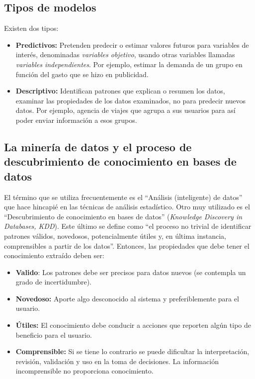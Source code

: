 \documentclass{article}
\begin{document}
\subsection{Tipos de modelos}

Existen dos tipos:

\begin{itemize}
  \item \textbf{Predictivos:} Pretenden predecir o estimar valores futuros para variables de interés, denominadas \textit{variables objetivo}, usando otras variables llamadas \textit{variables independientes}. Por ejemplo, estimar la demanda de un grupo en función del gasto que se hizo en publicidad.
  \item \textbf{Descriptivo:} Identifican patrones que explican o resumen los datos, examinar las propiedades de los datos examinados, no para predecir nuevos datos. Por ejemplo, agencia de viajes que agrupa a sus usuarios para así poder enviar información a esos grupos.
\end{itemize}

\subsection{La minería de datos y el proceso de descubrimiento de conocimiento en bases de datos}

El término que se utiliza frecuentemente es el ``Análisis (inteligente) de datos'' que hace
hincapié en las técnicas de análisis estadístico. Otro muy utilizado es el ``Descubrimiento de
conocimiento en bases de datos'' (\textit{Knowledge Discovery in Databases, KDD}). Este último se
define como ``el proceso no trivial de identificar patrones válidos, novedosos, potencialmente
útiles y, en última instancia, comprensibles a partir de los datos''. Entonces, las propiedades que debe tener el conocimiento extraído deben ser:

\begin{itemize}
  \item \textbf{Valido}: Los patrones debe ser precisos para datos nuevos (se contempla un grado de incertidumbre).
  \item \textbf{Novedoso:} Aporte algo desconocido al sistema y preferiblemente para el usuario.
  \item \textbf{Útiles:} El conocimiento debe conducir a acciones que reporten algún tipo de beneficio para el usuario.
  \item \textbf{Comprensible:} Si se tiene lo contrario se puede dificultar la interpretación, revisión, validación y uso en la toma de decisiones. La información incomprensible no proporciona conocimiento.
\end{itemize}
\end{document}

